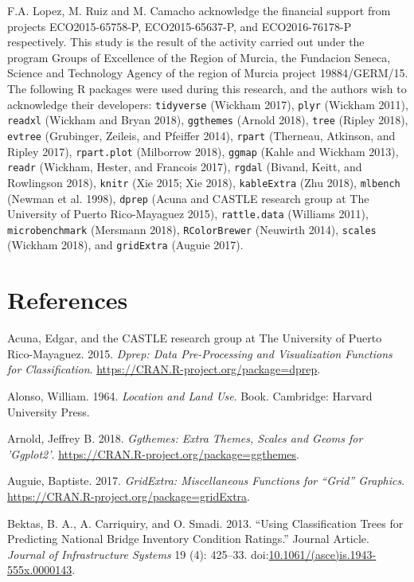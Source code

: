 \documentclass[]{elsarticle} %
\begin{document}
F.A. Lopez, M. Ruiz and M. Camacho acknowledge the financial support
from projects ECO2015-65758-P, ECO2015-65637-P, and ECO2016-76178-P
respectively. This study is the result of the activity carried out under
the program Groups of Excellence of the Region of Murcia, the Fundacion
Seneca, Science and Technology Agency of the region of Murcia project
19884/GERM/15. The following R packages were used during this research,
and the authors wish to acknowledge their developers: \texttt{tidyverse}
(Wickham 2017), \texttt{plyr} (Wickham 2011), \texttt{readxl} (Wickham
and Bryan 2018), \texttt{ggthemes} (Arnold 2018), \texttt{tree} (Ripley
2018), \texttt{evtree} (Grubinger, Zeileis, and Pfeiffer 2014),
\texttt{rpart} (Therneau, Atkinson, and Ripley 2017),
\texttt{rpart.plot} (Milborrow 2018), \texttt{ggmap} (Kahle and Wickham
2013), \texttt{readr} (Wickham, Hester, and Francois 2017),
\texttt{rgdal} (Bivand, Keitt, and Rowlingson 2018), \texttt{knitr} (Xie
2015; Xie 2018), \texttt{kableExtra} (Zhu 2018), \texttt{mlbench}
(Newman et al. 1998), \texttt{dprep} (Acuna and CASTLE research group at
The University of Puerto Rico-Mayaguez 2015), \texttt{rattle.data}
(Williams 2011), \texttt{microbenchmark} (Mersmann 2018),
\texttt{RColorBrewer} (Neuwirth 2014), \texttt{scales} (Wickham 2018),
and \texttt{gridExtra} (Auguie 2017).

\section*{References}\label{references}

\hypertarget{refs}{}
\hypertarget{ref-Acuna2015}{}
Acuna, Edgar, and the CASTLE research group at The University of Puerto
Rico-Mayaguez. 2015. \emph{Dprep: Data Pre-Processing and Visualization
Functions for Classification}.
\url{https://CRAN.R-project.org/package=dprep}.

\hypertarget{ref-Alonso1964}{}
Alonso, William. 1964. \emph{Location and Land Use}. Book. Cambridge:
Harvard University Press.

\hypertarget{ref-Arnold2018}{}
Arnold, Jeffrey B. 2018. \emph{Ggthemes: Extra Themes, Scales and Geoms
for 'Ggplot2'}. \url{https://CRAN.R-project.org/package=ggthemes}.

\hypertarget{ref-Auguie2017}{}
Auguie, Baptiste. 2017. \emph{GridExtra: Miscellaneous Functions for
``Grid'' Graphics}. \url{https://CRAN.R-project.org/package=gridExtra}.

\hypertarget{ref-Bektas2013}{}
Bektas, B. A., A. Carriquiry, and O. Smadi. 2013. ``Using Classification
Trees for Predicting National Bridge Inventory Condition Ratings.''
Journal Article. \emph{Journal of Infrastructure Systems} 19 (4):
425--33.
doi:\href{https://doi.org/10.1061/(asce)is.1943-555x.0000143}{10.1061/(asce)is.1943-555x.0000143}.
\end{document}
